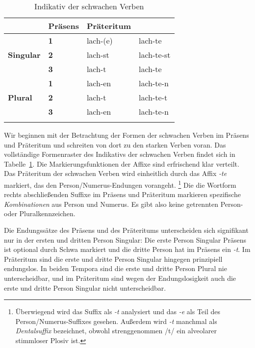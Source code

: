 \begin{table}[!htbp]
  \centering
  \begin{tabular}{llll}
    \lsptoprule
    \multicolumn{2}{c}{} & \textbf{Präsens} & \textbf{Präteritum} \\
    \midrule
    \multirow{3}{*}{\textbf{Singular}} & \textbf{1} & lach-(e) & lach-te \\
    & \textbf{2} & lach-st & lach-te-st \\
    &\textbf{3} & lach-t & lach-te \\
    \midrule
    \multirow{3}{*}{\textbf{Plural}} & \textbf{1} & lach-en & lach-te-n \\
    & \textbf{2} & lach-t & lach-te-t \\
    & \textbf{3} & lach-en & lach-te-n \\
    \lspbottomrule
  \end{tabular}
  \caption{Indikativ der schwachen Verben}
  \label{tab:tempusnumerusundperson082}
\end{table}


Wir beginnen mit der Betrachtung der Formen der schwachen Verben im Präsens und Präteritum und schreiten von dort zu den starken Verben voran.
Das vollständige Formenraster des Indikativs der schwachen Verben findet sich in Tabelle~\ref{tab:tempusnumerusundperson082}.
Die Markierungsfunktionen der Affixe sind erfrischend klar verteilt.
Das Präteritum der schwachen Verben wird einheitlich durch das Affix \textit{-te} markiert, das den Person\slash Numerus-Endungen vorangeht.%
\footnote{Überwiegend wird das Suffix als \textit{-t} analysiert und das \textit{-e} als Teil des Person\slash Numerus-Suffixes gesehen.
Außerdem wird \textit{-t} manchmal als \textit{Dentalsuffix} bezeichnet, obwohl strenggenommen /t/ ein alveolarer stimmloser Plosiv ist.}
Die die Wortform rechts abschließenden Suffixe im Präsens und Präteritum markieren spezifische \textit{Kombinationen} aus Person und Numerus.
Es gibt also keine getrennten Person- oder Pluralkennzeichen.

Die Endungssätze des Präsens und des Präteritums unterscheiden sich signifikant nur in der ersten und dritten Person Singular:
Die erste Person Singular Präsens ist optional durch Schwa markiert und die dritte Person hat im Präsens ein \textit{-t}.
Im Präteritum sind die erste und dritte Person Singular hingegen prinzipiell endungslos.
In beiden Tempora sind die erste und dritte Person Plural nie unterscheidbar, und im Präteritum sind wegen der Endungslosigkeit auch die erste und dritte Person Singular nicht unterscheidbar.

